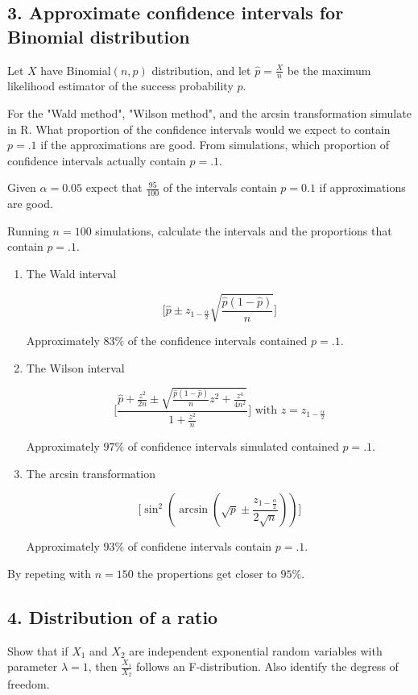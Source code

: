 \documentclass{tufte-book}
\begin{document}
\subsection{3. Approximate confidence intervals for Binomial distribution}
Let $X$ have Binomial$(n,p)$ distribution, and let $\hat{p}=\frac{X}{n}$ be the maximum likelihood estimator of the success probability $p$.

For the "Wald method", "Wilson method", and the arcsin transformation simulate in R. What proportion of the confidence intervals would we expect to contain $p=.1$ if the approximations are good.  From simulations, which proportion of confidence intervals actually contain $p=.1$.

Given $\alpha=0.05$ expect that $\frac{95}{100}$ of the intervals contain $p=0.1$ if approximations are good.

Running $n=100$ simulations, calculate the intervals and the proportions that contain $p=.1$.
\begin{enumerate}

\item The Wald interval

\[ \Big[ \hat{p} \pm z_{1-\frac{\alpha}{2}} \sqrt{\frac{\hat{p}(1-\hat{p})}{n}} \Big] \]

Approximately $83\%$ of the confidence intervals contained $p=.1$.

\item The Wilson interval

\[ \Big[ \frac{ \hat{p} + \frac{z^2}{2n} \pm \sqrt{\frac{\hat{p}(1-\hat{p})}{n}z^2 + \frac{z^4}{4n^2}} }{1 + \frac{z^2}{n}} \Big] \text{ with } z=z_{1-\frac{\alpha}{2}} \]

Approximately $97\%$ of confidence intervals simulated contained $p=.1$.

\item The arcsin transformation

\[ \Big[ \sin^2(\arcsin(\sqrt{p}\pm \frac{ z_{1-\frac{\alpha}{2}}}{2\sqrt{n}})) \Big] \]

Approximately $93\%$ of confidene intervals contain $p=.1$.

\end{enumerate}

By repeting with $n=150$ the propertions get closer to $95\%$.

\subsection{4. Distribution of a ratio}
Show that if $X_1$ and $X_2$ are independent exponential random variables with parameter $\lambda=1$, then $\frac{X_1}{X_2}$ follows an F-distribution.  Also identify the degress of freedom.
\end{document}
